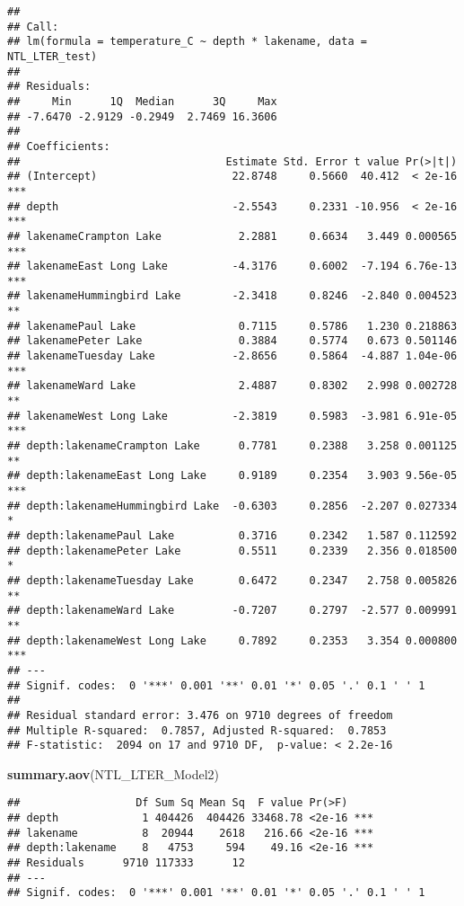 \documentclass[]{article}
\newenvironment{Shaded}{\begin{snugshade}}{\end{snugshade}}
\newcommand{\KeywordTok}[1]{\textcolor[rgb]{0.13,0.29,0.53}{\textbf{#1}}}
\newcommand{\NormalTok}[1]{#1}
\begin{document}
\begin{verbatim}
## 
## Call:
## lm(formula = temperature_C ~ depth * lakename, data = NTL_LTER_test)
## 
## Residuals:
##     Min      1Q  Median      3Q     Max 
## -7.6470 -2.9129 -0.2949  2.7469 16.3606 
## 
## Coefficients:
##                                Estimate Std. Error t value Pr(>|t|)    
## (Intercept)                     22.8748     0.5660  40.412  < 2e-16 ***
## depth                           -2.5543     0.2331 -10.956  < 2e-16 ***
## lakenameCrampton Lake            2.2881     0.6634   3.449 0.000565 ***
## lakenameEast Long Lake          -4.3176     0.6002  -7.194 6.76e-13 ***
## lakenameHummingbird Lake        -2.3418     0.8246  -2.840 0.004523 ** 
## lakenamePaul Lake                0.7115     0.5786   1.230 0.218863    
## lakenamePeter Lake               0.3884     0.5774   0.673 0.501146    
## lakenameTuesday Lake            -2.8656     0.5864  -4.887 1.04e-06 ***
## lakenameWard Lake                2.4887     0.8302   2.998 0.002728 ** 
## lakenameWest Long Lake          -2.3819     0.5983  -3.981 6.91e-05 ***
## depth:lakenameCrampton Lake      0.7781     0.2388   3.258 0.001125 ** 
## depth:lakenameEast Long Lake     0.9189     0.2354   3.903 9.56e-05 ***
## depth:lakenameHummingbird Lake  -0.6303     0.2856  -2.207 0.027334 *  
## depth:lakenamePaul Lake          0.3716     0.2342   1.587 0.112592    
## depth:lakenamePeter Lake         0.5511     0.2339   2.356 0.018500 *  
## depth:lakenameTuesday Lake       0.6472     0.2347   2.758 0.005826 ** 
## depth:lakenameWard Lake         -0.7207     0.2797  -2.577 0.009991 ** 
## depth:lakenameWest Long Lake     0.7892     0.2353   3.354 0.000800 ***
## ---
## Signif. codes:  0 '***' 0.001 '**' 0.01 '*' 0.05 '.' 0.1 ' ' 1
## 
## Residual standard error: 3.476 on 9710 degrees of freedom
## Multiple R-squared:  0.7857, Adjusted R-squared:  0.7853 
## F-statistic:  2094 on 17 and 9710 DF,  p-value: < 2.2e-16
\end{verbatim}

\begin{Shaded}
\begin{Highlighting}[]
\KeywordTok{summary.aov}\NormalTok{(NTL_LTER_Model2)}
\end{Highlighting}
\end{Shaded}

\begin{verbatim}
##                  Df Sum Sq Mean Sq  F value Pr(>F)    
## depth             1 404426  404426 33468.78 <2e-16 ***
## lakename          8  20944    2618   216.66 <2e-16 ***
## depth:lakename    8   4753     594    49.16 <2e-16 ***
## Residuals      9710 117333      12                    
## ---
## Signif. codes:  0 '***' 0.001 '**' 0.01 '*' 0.05 '.' 0.1 ' ' 1
\end{verbatim}
\end{document}
